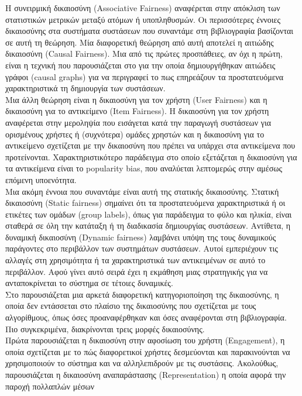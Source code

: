 Η συνειρμική δικαιοσύνη (Associative Fairness) αναφέρεται στην απόκλιση των στατιστικών μετρικών μεταξύ ατόμων ή υποπληθυσμών. Οι περισσότερες έννοιες δικαιοσύνης στα συστήματα συστάσεων που συναντάμε στη βιβλιογραφία βασίζονται σε αυτή τη θεώρηση. Μία διαφορετική θεώρηση από αυτή αποτελεί η αιτιώδης δικαιοσύνη (Causal Fairness). Μια από τις πρώτες προσπάθειες, αν όχι η πρώτη, είναι η τεχνική που παρουσιάζεται στο \cite{liPersonalizedFairnessBased2021} για την οποία δημιουργήθηκαν αιτιώδεις γράφοι (causal graphs) για να περιγραφεί το πως επηρεάζουν τα προστατευόμενα χαρακτηριστικά τη δημιουργία των συστάσεων. \\
Μια άλλη θεώρηση είναι η δικαιοσύνη για τον χρήστη (User Fairness) και η δικαιοσύνη για το αντικείμενο (Item Fairness). Η δικαιοσύνη για τον χρήστη αναφέρεται στην μεροληψία που εισάγεται κατά την παραγωγή συστάσεων για ορισμένους χρήστες ή (συχνότερα) ομάδες χρηστών και η δικαιοσύνη για το αντικείμενο σχετίζεται με την δικαιοσύνη που πρέπει να υπάρχει στα αντικείμενα που προτείνονται. Χαρακτηριστικότερο παράδειγμα στο οποίο εξετάζεται η δικαιοσύνη για τα αντικείμενα είναι το popularity bias, που αναλύεται λεπτομερώς στην αμέσως επόμενη υποενότητα. \\
Μια ακόμη έννοια που συναντάμε είναι αυτή της στατικής δικαιοσύνης. Στατική δικαιοσύνη (Static fairness) σημαίνει ότι τα προστατευόμενα χαρακτηριστικά ή οι ετικέτες των ομάδων (group labels), όπως για παράδειγμα το φύλο και ηλικία, είναι σταθερά σε όλη την κατάταξη ή τη διαδικασία δημιουργίας συστάσεων. Αντίθετα, η δυναμική δικαιοσύνη
(Dynamic fairness) \cite{geLongtermFairnessRecommendation2021} λαμβάνει υπόψη της τους δυναμικούς παράγοντες στο περιβάλλον των συστημάτων συστάσεων. Αυτοί εμπεριέχουν τις αλλαγές στη χρησιμότητα ή τα χαρακτηριστικά των αντικειμένων σε αυτό το περιβάλλον. Αφού γίνει αυτό σειρά έχει η εκμάθηση μιας στρατηγικής για να ανταποκρίνεται το σύστημα σε τέτοιες δυναμικές.\\
Στο \cite{elahiAlgorithmicFairnessRecommender2021} παρουσιάζεται μια αρκετά διαφορετική κατηγοριοποίηση της δικαιοσύνης, η οποία δεν εντάσσεται στο πλαίσιο της δικαιοσύνης που σχετίζεται με τους αλγορίθμους, όπως όσες προαναφέρθηκαν και όσες αναφέρονται στη βιβλιογραφία. Πιο συγκεκριμένα, διακρίνονται τρεις μορφές δικαιοσύνης.\\
 Πρώτα παρουσιάζεται η δικαιοσύνη στην αφοσίωση του χρήστη (Engagement), η οποία σχετίζεται με το πώς διαφορετικοί χρήστες δεσμεύονται και παρακινούνται να χρησιμοποιούν το σύστημα και να αλληλεπιδρούν
με τις συστάσεις. Ακολούθως, παρουσιάζεται η δικαιοσύνη αναπαράστασης (Representation)  η οποία αφορά την παροχή πολλαπλών μέσων
